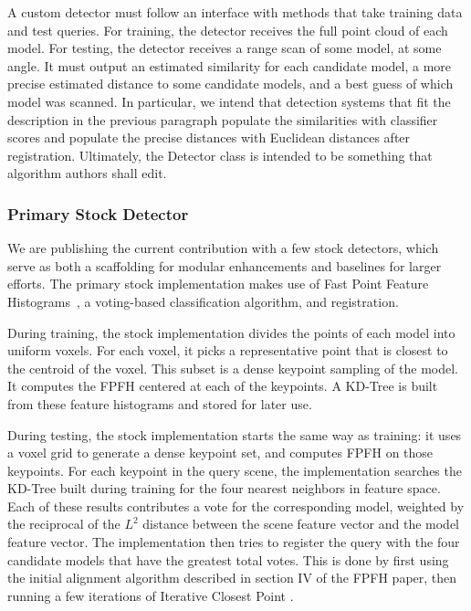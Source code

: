 A custom detector must follow an interface with methods that take training data and test queries.
For training, the detector receives the full point cloud of each model.
For testing, the detector receives a range scan of some model, at some angle. It must output an estimated similarity for each candidate model, a more precise estimated distance to some candidate models, and a best guess of which model was scanned.
In particular, we intend that detection systems that fit the description in the previous paragraph populate the similarities with classifier scores and populate the precise distances with Euclidean distances after registration.
Ultimately, the Detector class is intended to be something that algorithm authors shall edit.

\subsubsection{Primary Stock Detector}
We are publishing the current contribution with a few stock detectors, which serve as both a scaffolding for modular enhancements and baselines for larger efforts.
The primary stock implementation makes use of Fast Point Feature Histograms~\cite{fpfh1, fpfh2}, a voting-based classification algorithm, and registration.

During training, the stock implementation divides the points of each model into uniform voxels. For each voxel, it picks a representative point that is closest to the centroid of the voxel. This subset is a dense keypoint sampling of the model. It computes the FPFH centered at each of the keypoints. A KD-Tree is built from these feature histograms and stored for later use.

During testing, the stock implementation starts the same way as training: it uses a voxel grid to generate a dense keypoint set, and computes FPFH on those keypoints.
For each keypoint in the query scene, the implementation searches the KD-Tree built during training for the four nearest neighbors in feature space. Each of these results contributes a vote for the corresponding model, weighted by the reciprocal of the $L^2$ distance between the scene feature vector and the model feature vector.
The implementation then tries to register the query with the four candidate models that have the greatest total votes.
This is done by first using the initial alignment algorithm described in section IV of the FPFH paper, then running a few iterations of Iterative Closest Point \cite{BeslMcKay}.

